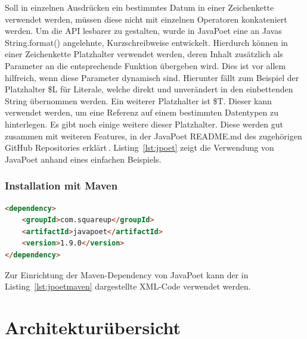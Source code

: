 \documentclass[12pt,oneside,a4paper,parskip]{scrbook}
\begin{document}
Soll in einzelnen Ausdrücken ein bestimmtes Datum in einer Zeichenkette verwendet werden, müssen diese nicht mit einzelnen Operatoren konkateniert werden. Um die API lesbarer zu gestalten, wurde in JavaPoet eine an Javas String.format() angelehnte, Kurzschreibweise entwickelt. Hierdurch können in einer Zeichenkette Platzhalter verwendet werden, deren Inhalt zusätzlich als Parameter an die entsprechende Funktion übergeben wird. Dies ist vor allem hilfreich, wenn diese Parameter dynamisch sind. Hierunter fällt zum Beispiel der Platzhalter \$L für Literale, welche direkt und unverändert in den einbettenden String übernommen werden. Ein weiterer Platzhalter ist \$T. Dieser kann verwendet werden, um eine Referenz auf einem bestimmten Datentypen zu hinterlegen. Es gibt noch einige weitere dieser Platzhalter. Diese werden gut zusammen mit weiteren Features, in der JavaPoet README.md des zugehörigen GitHub Repositories erklärt\,\cite{javapoet2017}. Listing~\ref{lst:jpoet} zeigt die Verwendung von JavaPoet anhand eines einfachen Beispiels.

\subsubsection{Installation mit Maven}

\begin{lstlisting}[label=lst:jpoetmaven,
language=HTML,
firstnumber=1,
caption=XML-Code zum Einbinden von JavaPoet als Maven-Dependency.]
<dependency>
	<groupId>com.squareup</groupId>
	<artifactId>javapoet</artifactId>
	<version>1.9.0</version>
</dependency>
\end{lstlisting}

Zur Einrichtung der Maven-Dependency von JavaPoet kann der in Listing~\ref{lst:jpoetmaven} dargestellte XML-Code verwendet werden.

\section{Architekturübersicht}
\end{document}
